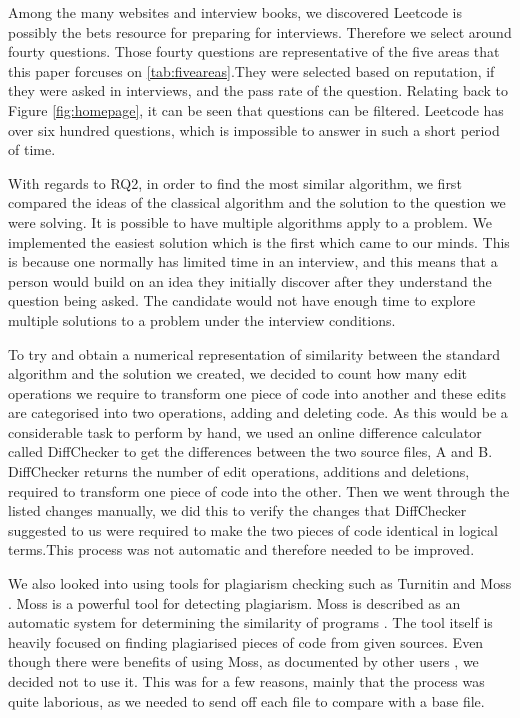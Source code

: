 \documentclass[10pt,twocolumn,hidelinks]{IEEEtran}
\begin{document}
\par Among the many websites and interview books, we discovered Leetcode is possibly the bets resource for preparing for interviews. Therefore we select around fourty questions. Those fourty questions are representative of the five areas that this paper forcuses on \ref{tab:fiveareas}.They were selected based on reputation, if they were asked in interviews, and the pass rate of the question. Relating back to Figure \ref{fig:homepage}, it can be seen that questions can be filtered. Leetcode has over six hundred questions, which is impossible to answer in such a short period of time.
\par With regards to RQ2, in order to find the most similar algorithm, we first compared the ideas of the classical algorithm and the solution to the question we were solving. It is possible to have multiple algorithms apply to a problem. We implemented the easiest solution which is the first which came to our minds. This is because one normally has limited time in an interview, and this means that a person would build on an idea they initially discover after they understand the question being asked. The candidate would not have enough time to explore multiple solutions to a problem under the interview conditions. 
\par To try and obtain a numerical representation of similarity between the standard algorithm and the solution we created, we decided to count how many edit operations we require to transform one piece of code into another and these edits are categorised into two operations, adding and deleting code.
As this would be a considerable task to perform by hand, we used an online difference calculator called DiffChecker \cite{diff} to get the differences between the two source files, A and B. DiffChecker returns the number of edit operations, additions and deletions, required to transform one piece of code into the other. Then we went through the listed changes manually, we did this to verify the changes that DiffChecker suggested to us were required to make the two pieces of code identical in logical terms.This process was not automatic and therefore needed to be improved. 
\par We also looked into using tools for plagiarism checking such as Turnitin and Moss \cite{Schleimer:2003:WLA:872757.872770}. Moss is a powerful tool for detecting plagiarism. Moss is described as an automatic system for determining the similarity of programs \cite{mosswebsite}. The tool itself is heavily focused on finding plagiarised pieces of code from given sources. Even though there were benefits of using Moss, as documented by other users \cite{MossBowyer}, we decided not to use it. This was for a few reasons, mainly that the process was quite laborious, as we needed to send off each file to compare with a base file. 
\end{document}
